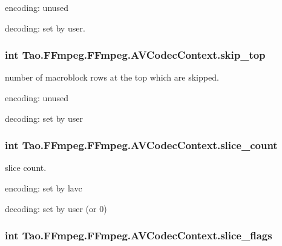 \begin{DoxyItemize}
\item encoding: unused
\item decoding: set by user. 
\end{DoxyItemize}\hypertarget{struct_tao_1_1_f_fmpeg_1_1_f_fmpeg_1_1_a_v_codec_context_a004c61a934ab324fd500e26ccf486469}{
\subsubsection[{skip\_\-top}]{\setlength{\rightskip}{0pt plus 5cm}int {\bf Tao.FFmpeg.FFmpeg.AVCodecContext.skip\_\-top}}}
\label{struct_tao_1_1_f_fmpeg_1_1_f_fmpeg_1_1_a_v_codec_context_a004c61a934ab324fd500e26ccf486469}
number of macroblock rows at the top which are skipped.
\begin{DoxyItemize}
\item encoding: unused
\item decoding: set by user 
\end{DoxyItemize}\hypertarget{struct_tao_1_1_f_fmpeg_1_1_f_fmpeg_1_1_a_v_codec_context_a2214c793b01d7799ed2e3e93f271c83f}{
\subsubsection[{slice\_\-count}]{\setlength{\rightskip}{0pt plus 5cm}int {\bf Tao.FFmpeg.FFmpeg.AVCodecContext.slice\_\-count}}}
\label{struct_tao_1_1_f_fmpeg_1_1_f_fmpeg_1_1_a_v_codec_context_a2214c793b01d7799ed2e3e93f271c83f}
slice count.
\begin{DoxyItemize}
\item encoding: set by lavc
\item decoding: set by user (or 0) 
\end{DoxyItemize}\hypertarget{struct_tao_1_1_f_fmpeg_1_1_f_fmpeg_1_1_a_v_codec_context_ac9d4fe45215140685c69b52c44757704}{
\subsubsection[{slice\_\-flags}]{\setlength{\rightskip}{0pt plus 5cm}int {\bf Tao.FFmpeg.FFmpeg.AVCodecContext.slice\_\-flags}}}
